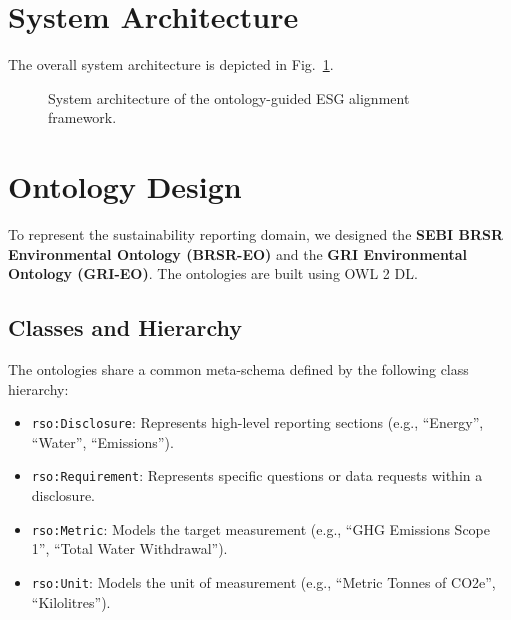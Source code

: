 \documentclass[journal,compsoc]{IEEEtran}
\begin{document}
\section{System Architecture}
The overall system architecture is depicted in Fig.~\ref{fig:framework}.

\begin{figure}[t]
\centering
{}
\caption{System architecture of the ontology-guided ESG alignment framework.}
\label{fig:framework}
\end{figure}

\section{Ontology Design}
To represent the sustainability reporting domain, we designed the \textbf{SEBI BRSR Environmental Ontology (BRSR-EO)} and the \textbf{GRI Environmental Ontology (GRI-EO)}. The ontologies are built using OWL 2 DL.

\subsection{Classes and Hierarchy}
The ontologies share a common meta-schema defined by the following class hierarchy:
\begin{itemize}
    \item \texttt{rso:Disclosure}: Represents high-level reporting sections (e.g., ``Energy'', ``Water'', ``Emissions'').
    \item \texttt{rso:Requirement}: Represents specific questions or data requests within a disclosure.
    \item \texttt{rso:Metric}: Models the target measurement (e.g., ``GHG Emissions Scope 1'', ``Total Water Withdrawal'').
    \item \texttt{rso:Unit}: Models the unit of measurement (e.g., ``Metric Tonnes of CO2e'', ``Kilolitres'').
\end{itemize}
\end{document}

